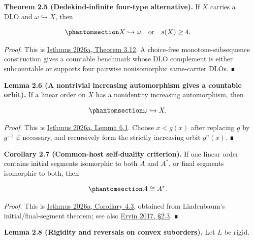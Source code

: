 \documentclass[
  english,
  11pt,
  reqno]{amsart}
\begin{document}
\protect{}\label{thm:2-5-dedekind-alternative}

\textbf{Theorem 2.5 (Dedekind-infinite four-type alternative).} If \(X\)
carries a DLO and \(\omega\hookrightarrow X\), then

\begin{equation}\protect\phantomsection\label{eq:dedekind-alternative}{
X\hookrightarrow\omega
\quad\text{or}\quad
s(X)\ge4.
}\end{equation}

\emph{Proof.} This is \hyperref[ref:isthmus2026a]{Isthmus 2026a, Theorem
3.12}. A choice-free monotone-subsequence construction gives a countable
benchmark whose DLO complement is either subcountable or supports four
pairwise nonisomorphic same-carrier DLOs. ∎

\protect{}\label{lem:2-6-automorphism-orbit}

\textbf{Lemma 2.6 (A nontrivial increasing automorphism gives a
countable orbit).} If a linear order on \(X\) has a nonidentity
increasing automorphism, then

\begin{equation}\protect\phantomsection\label{eq:automorphism-orbit}{
\omega\hookrightarrow X.
}\end{equation}

\emph{Proof.} This is \hyperref[ref:isthmus2026a]{Isthmus 2026a, Lemma
6.1}. Choose \(x<g(x)\) after replacing \(g\) by \(g^{-1}\) if
necessary, and recursively form the strictly increasing orbit
\(g^n(x)\). ∎

\protect{}\label{cor:2-7-common-host}

\textbf{Corollary 2.7 (Common-host self-duality criterion).} If one
linear order contains initial segments isomorphic to both \(A\) and
\(A^*\), or final segments isomorphic to both, then

\begin{equation}\protect\phantomsection\label{eq:common-host}{
A\cong A^*.
}\end{equation}

\emph{Proof.} This is \hyperref[ref:isthmus2026a]{Isthmus 2026a,
Corollary 4.3}, obtained from Lindenbaum's initial/final-segment
theorem; see also \hyperref[ref:ervin2017]{Ervin 2017, §2.3}. ∎

\protect{}\label{lem:2-8-rigidity-convex}

\textbf{Lemma 2.8 (Rigidity and reversals on convex suborders).} Let
\(L\) be rigid.
\end{document}
